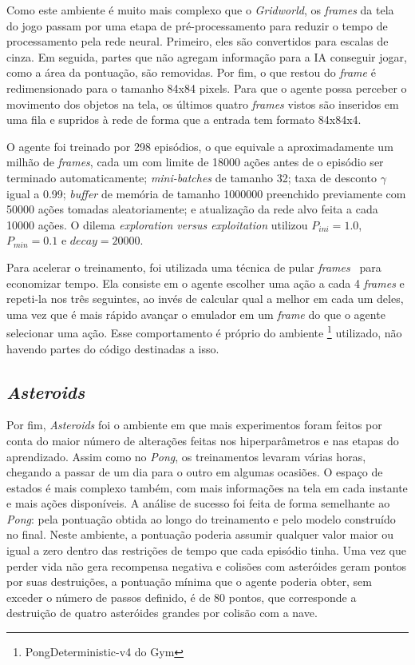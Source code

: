 Como este ambiente é muito mais complexo que o \textit{Gridworld}, os \textit{frames} da tela do jogo passam por uma etapa de pré-processamento para reduzir o tempo de processamento pela rede neural.
Primeiro, eles são convertidos para escalas de cinza.
Em seguida, partes que não agregam informação para a IA conseguir jogar, como a área da pontuação, são removidas.
Por fim, o que restou do \textit{frame} é redimensionado para o tamanho 84x84 pixels.
Para que o agente possa perceber o movimento dos objetos na tela, os últimos quatro \textit{frames} vistos são inseridos em uma fila e supridos à rede de forma que a entrada tem formato 84x84x4.

O agente foi treinado por 298 episódios, o que equivale a aproximadamente um milhão de \textit{frames}, cada um com limite de 18000 ações antes de o episódio ser terminado automaticamente;
\textit{mini-batches} de tamanho 32; taxa de desconto $\gamma$ igual a 0.99;
\textit{buffer} de memória de tamanho 1000000 preenchido previamente com 50000 ações tomadas aleatoriamente;
e atualização da rede alvo feita a cada 10000 ações.
O dilema \textit{exploration versus exploitation} utilizou $P_{ini} = 1.0$, $P_{min} = 0.1$ e $decay = 20000$.

Para acelerar o treinamento, foi utilizada uma técnica de pular \textit{frames}~\cite{DBLP:journals/corr/abs-1207-4708} para economizar tempo.
Ela consiste em o agente escolher uma ação a cada 4 \textit{frames} e repeti-la nos três seguintes, ao invés de calcular qual a melhor em cada um deles, uma vez que é mais rápido avançar o emulador em um \textit{frame} do que o agente selecionar uma ação.
Esse comportamento é próprio do ambiente \footnote{PongDeterministic-v4 do Gym} utilizado, não havendo partes do código destinadas a isso.

\subsection{\textit{Asteroids}}
\label{sec:exp_asteroids}

Por fim, \textit{Asteroids} foi o ambiente em que mais experimentos foram feitos por conta do maior número de alterações feitas nos hiperparâmetros e nas etapas do aprendizado.
Assim como no \textit{Pong}, os treinamentos levaram várias horas, chegando a passar de um dia para o outro em algumas ocasiões.
O espaço de estados é mais complexo também, com mais informações na tela em cada instante e mais ações disponíveis.
A análise de sucesso foi feita de forma semelhante ao \textit{Pong}: pela pontuação obtida ao longo do treinamento e pelo modelo construído no final.
Neste ambiente, a pontuação poderia assumir qualquer valor maior ou igual a zero dentro das restrições de tempo que cada episódio tinha.
Uma vez que perder vida não gera recompensa negativa e colisões com asteróides geram pontos por suas destruições, a pontuação mínima que o agente poderia obter, sem exceder o número de passos definido, é de 80 pontos, que corresponde a destruição de quatro asteróides grandes por colisão com a nave.

